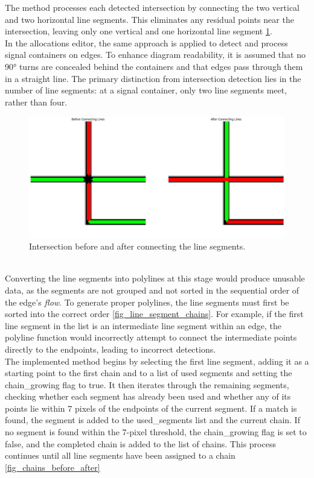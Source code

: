 The method processes each detected intersection by connecting the two vertical and two horizontal line segments. This eliminates any residual points near the intersection, leaving only one vertical and one horizontal line segment \ref{fig:_intersection_before_after}.\\
In the allocations editor, the same approach is applied to detect and process signal containers on edges. To enhance diagram readability, it is assumed that no 90° turns are concealed behind the containers and that edges pass through them in a straight line. The primary distinction from intersection detection lies in the number of line segments: at a signal container, only two line segments meet, rather than four.
\begin{figure}[h]
    \centering
    \includegraphics[width=0.7\linewidth]{Pictures/intersection_before_after.png}
    \caption{Intersection before and after connecting the line segments.}
    \label{fig:_intersection_before_after}
\end{figure}\\
Converting the line segments into polylines at this stage would produce unusable data, as the segments are not grouped and not sorted in the sequential order of the edge's \textit{flow}. To generate proper polylines, the line segments must first be sorted into the correct order \ref{fig_line_segment_chains}. For example, if the first line segment in the list is an intermediate line segment within an edge, the polyline function would incorrectly attempt to connect the intermediate points directly to the endpoints, leading to incorrect detections.\\
The implemented method begins by selecting the first line segment, adding it as a starting point to the first chain and to a list of used segments and setting the chain\_growing flag to true. It then iterates through the remaining segments, checking whether each segment has already been used and whether any of its points lie within 7 pixels of the endpoints of the current segment. If a match is found, the segment is added to the used\_segments list and the current chain. If no segment is found within the 7-pixel threshold, the chain\_growing flag is set to false, and the completed chain is added to the list of chains. This process continues until all line segments have been assigned to a chain \ref{fig_chains_before_after}
